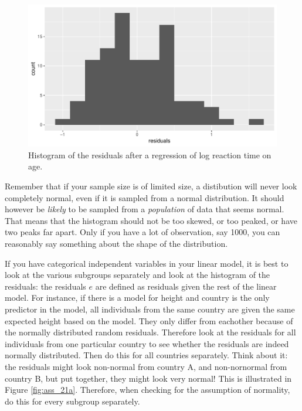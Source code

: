 \documentclass[]{book}\usepackage[]{graphicx}\usepackage[]{color}
\makeatletter
\def\maxwidth{ %
  \ifdim\Gin@nat@width>\linewidth
    \linewidth
  \else
    \Gin@nat@width
  \fi
}
\newenvironment{knitrout}{}{} %
\makeatother
\begin{document}
\begin{knitrout}
\color{fgcolor}\begin{figure}

{\centering \includegraphics[width=\maxwidth]{figure/ass_21-1} 

}

\caption[Histogram of the residuals after a regression of log reaction time on age]{Histogram of the residuals after a regression of log reaction time on age.}\label{fig:ass_21}
\end{figure}


\end{knitrout}

Remember that if your sample size is of limited size, a distibution will never look completely normal, even if it is sampled from a normal distribution. It should however be \textit{likely} to be sampled from a \textit{population} of data that seems normal. That means that the histogram should not be too skewed, or too peaked, or have two peaks far apart. Only if you have a lot of observation, say 1000, you can reasonably say something about the shape of the distribution. 

If you have categorical independent variables in your linear model, it is best to look at the various subgroups separately and look at the histogram of the residuals: the residuals $e$ are defined as residuals given the rest of the linear model. For instance, if there is a model for height and country is the only predictor in the model, all individuals from the same country are given the same expected height based on the model. They only differ from eachother because of the normally distributed random residuals. Therefore look at the residuals for all individuals from one particular country to see whether the residuals are indeed normally distributed. Then do this for all countries separately. Think about it: the residuals might look non-normal from country A, and non-nornormal from country B, but put together, they might look very normal! This is illustrated in Figure \ref{fig:ass_21a}. Therefore, when checking for the assumption of normality, do this for every subgroup separately.  
\end{document}
